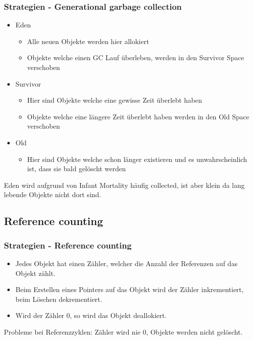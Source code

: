 \documentclass{beamer}
\begin{document}
            \begin{frame}
                \frametitle{Strategien - Generational garbage collection}
                \begin{itemize}
                    \item Eden
                    \begin{itemize}
                        \item Alle neuen Objekte werden hier allokiert
                        \item Objekte welche einen GC Lauf überleben, werden in den Survivor Space verschoben
                    \end{itemize}
                    \item Survivor
                    \begin{itemize}
                        \item Hier sind Objekte welche eine gewisse Zeit überlebt haben
                        \item Objekte welche eine längere Zeit überlebt haben werden in den Old Space verschoben
                    \end{itemize}
                    \item Old
                    \begin{itemize}
                        \item Hier sind Objekte welche schon länger existieren und es unwahrscheinlich ist, dass sie bald gelöscht werden
                    \end{itemize}
                \end{itemize}
                Eden wird aufgrund von Infant Mortality häufig collected, ist aber klein da lang lebende Objekte nicht dort sind.
            \end{frame}

        \subsection{Reference counting}
            \begin{frame}
                \frametitle{Strategien - Reference counting}

                \begin{itemize}
                    \item Jedes Objekt hat einen Zähler, welcher die Anzahl der Referenzen auf das Objekt zählt.\\
                    \item Beim Erstellen eines Pointers auf das Objekt wird der Zähler inkrementiert, beim Löschen dekrementiert.\\
                    \item Wird der Zähler 0, so wird das Objekt deallokiert.
                \end{itemize}
                Probleme bei Referenzzyklen: Zähler wird nie 0, Objekte werden nicht gelöscht.
            \end{frame}
\end{document}
